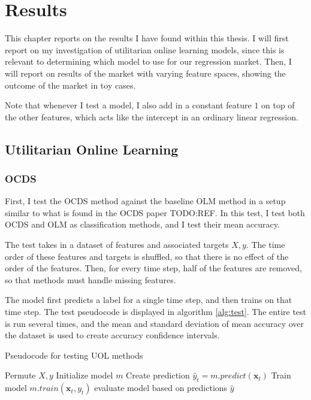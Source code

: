 

\chapter{Results}


This chapter reports on the results I have found within this thesis. I will
first report on my investigation of utilitarian online learning models, since
this is relevant to determining which model to use for our regression market.
Then, I will report on results of the market with varying feature spaces,
showing the outcome of the market in toy cases.

Note that whenever I test a model, I also add in a constant feature $1$ on top
of the other features, which acts like the intercept in an ordinary linear
regression.

\section{Utilitarian Online Learning}
\subsection{OCDS}
First, I test the OCDS method against the baseline OLM method in a setup similar
to what is found in the OCDS paper TODO:REF. In this test, I test both OCDS and
OLM as classification methods, and I test their mean accuracy.

The test takes in a dataset of features and associated targets $X,y$. The time
order of these features and targets is shuffled, so that there is no effect of
the order of the features. Then, for every time step, half of the features are
removed, so that methods must handle missing features.

The model first predicts a label for a single time step, and
then trains on that time step. The test pseudocode is displayed in algorithm
\ref{alg:test}. The entire test is run several times, and the mean and standard
deviation of mean accuracy over the dataset is used to create accuracy
confidence intervals.

\begin{algorithm}
  \caption{Pseudocode for testing UOL methods}\label{alg:test}
  \begin{algorithmic}
    \State Permute $X,y$
    \State Initialize model $m$
    \State Create prediction $\hat y_t = m.predict(\mathbf {x}_t)$
    \State Train model $m.train(\mathbf{x}_t,y_t)$
    \EndFor
    \State evaluate model based on predictions $\hat y$
  \end{algorithmic}
\end{algorithm}

